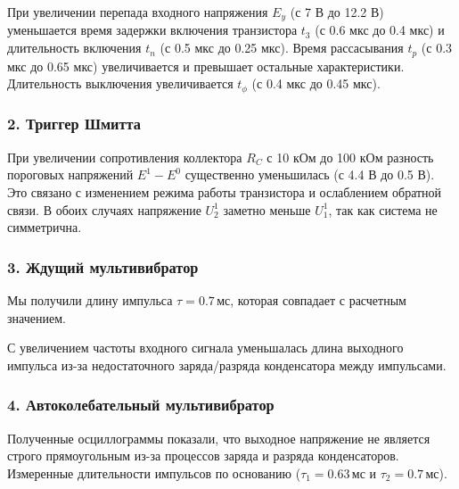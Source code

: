 \documentclass[a4paper, 12pt]{article}
\begin{document}
При увеличении перепада входного напряжения \(E_y\) (с 7 В до 12.2 В) уменьшается время задержки включения транзистора \(t_3\) (с 0.6 мкс до 0.4 мкс) и длительность включения \(t_n\) (с 0.5 мкс до 0.25 мкс). Время рассасывания \(t_p\) (с 0.3 мкс до 0.65 мкс) увеличивается и превышает остальные характеристики. Длительность выключения увеличивается \(t_\phi\) (с 0.4 мкс до 0.45 мкс).

\subsubsection*{2. Триггер Шмитта}
При увеличении сопротивления коллектора \(R_C\) с 10 кОм до 100 кОм разность пороговых напряжений \(E^1 - E^0\) существенно уменьшилась (с 4.4 В до 0.5 В). Это связано с изменением режима работы транзистора и ослаблением обратной связи. В обоих случаях напряжение \(U_2^1\) заметно меньше \(U_1^1\), так как система не симметрична.

\subsubsection*{3. Ждущий мультивибратор}
Мы получили длину импульса \(\tau = 0.7 \, \text{мс}\), которая совпадает с расчетным значением.

С увеличением частоты входного сигнала уменьшалась длина выходного импульса из-за недостаточного заряда/разряда конденсатора между импульсами.

\subsubsection*{4. Автоколебательный мультивибратор}
Полученные осциллограммы показали, что выходное напряжение не является строго прямоугольным из-за процессов заряда и разряда конденсаторов. Измеренные длительности импульсов по основанию (\(\tau_1=0.63 \, \text{мс}\) и \(\tau_2=0.7 \, \text{мс}\)).
\end{document}
